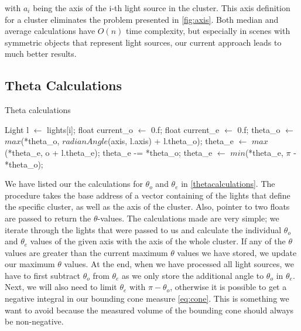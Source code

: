 with $a_i$ being the axis of the i-th light source in the cluster. This axis definition for a cluster eliminates the problem presented in \ref{fig:axis}. Both median and average calculations have $O(n)$ time complexity, but especially in scenes with symmetric objects that represent light sources, our current approach leads to much better results.

\subsection{Theta Calculations}
\label{subs:theta}

\begin{algorithm}
	\caption{Theta calculations}
	\label{thetacalculations}
	\begin{algorithmic}[1] %
			\State Light l $\gets$ lights[i];
			\State float current\_o $\gets$ 0.f;
			\State float current\_e $\gets$ 0.f;	
			\State 	*theta\_o $\gets$ $max$(*theta\_o, $radianAngle$(axis, l.axis) + l.theta\_o);
			\State *theta\_e $\gets$ $max$(*theta\_e, o + l.theta\_e);
		\EndFor
		\State *theta\_e -= *theta\_o;
		\State *theta\_e $\gets$ $min$(*theta\_e, $\pi$ - *theta\_o);
		\EndProcedure
	\end{algorithmic}
\end{algorithm}

We have listed our the calculations for $\theta_o$ and $\theta_e$ in \ref{thetacalculations}. The procedure takes the base address of a vector containing of the lights that define the specific cluster, as well as the axis of the cluster. Also, pointer to two floats are passed to return the $\theta$-values. The calculations made are very simple; we iterate through the lights that were passed to us and calculate the individual $\theta_o$ and $\theta_e$ values of the given axis with the axis of the whole cluster. If any of the $\theta$ values are greater than the current maximum $\theta$ values we have stored, we update our maximum $\theta$ values. At the end, when we have processed all light sources, we have to first subtract $\theta_o$ from $\theta_e$ as we only store the additional angle to $\theta_o$ in $\theta_e$. Next, we will also need to limit $\theta_e$ with $\pi - \theta_o$, otherwise it is possible to get a negative integral in our bounding cone measure \ref{eq:cone}. This is something we want to avoid because the measured volume of the bounding cone should always be non-negative.

